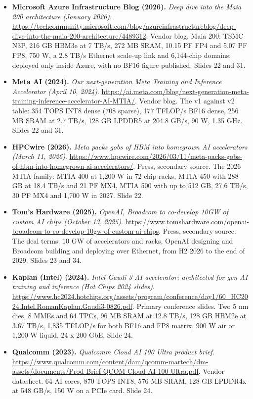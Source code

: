 \documentclass[11pt,letterpaper]{article}
\begin{document}
\begin{itemize}[leftmargin=1.2em,itemsep=3pt]
\item \textbf{Microsoft Azure Infrastructure Blog (2026).} \textit{Deep dive into the Maia 200 architecture (January 2026)}. \url{https://techcommunity.microsoft.com/blog/azureinfrastructureblog/deep-dive-into-the-maia-200-architecture/4489312}. Vendor blog. Maia 200: TSMC N3P, 216 GB HBM3e at 7 TB/s, 272 MB SRAM, 10.15 PF FP4 and 5.07 PF FP8, 750 W, a 2.8 TB/s Ethernet scale-up link and 6,144-chip domains; deployed only inside Azure, with no BF16 figure published. Slides 22 and 31.
\item \textbf{Meta AI (2024).} \textit{Our next-generation Meta Training and Inference Accelerator (April 10, 2024)}. \url{https://ai.meta.com/blog/next-generation-meta-training-inference-accelerator-AI-MTIA/}. Vendor blog. The v1 against v2 table: 354 TOPS INT8 dense (708 sparse), 177 TFLOP/s BF16 dense, 256 MB SRAM at 2.7 TB/s, 128 GB LPDDR5 at 204.8 GB/s, 90 W, 1.35 GHz. Slides 22 and 31.
\item \textbf{HPCwire (2026).} \textit{Meta packs gobs of HBM into homegrown AI accelerators (March 11, 2026)}. \url{https://www.hpcwire.com/2026/03/11/meta-packs-gobs-of-hbm-into-homegrown-ai-accelerators/}. Press, secondary source. The 2026 MTIA family: MTIA 400 at 1,200 W in 72-chip racks, MTIA 450 with 288 GB at 18.4 TB/s and 21 PF MX4, MTIA 500 with up to 512 GB, 27.6 TB/s, 30 PF MX4 and 1,700 W in 2027. Slide 22.
\item \textbf{Tom's Hardware (2025).} \textit{OpenAI, Broadcom to co-develop 10GW of custom AI chips (October 13, 2025)}. \url{https://www.tomshardware.com/openai-broadcom-to-co-develop-10gw-of-custom-ai-chips}. Press, secondary source. The deal terms: 10 GW of accelerators and racks, OpenAI designing and Broadcom building and deploying over Ethernet, from H2 2026 to the end of 2029. Slides 23 and 34.
\item \textbf{Kaplan (Intel) (2024).} \textit{Intel Gaudi 3 AI accelerator: architected for gen AI training and inference (Hot Chips 2024 slides)}. \url{https://www.hc2024.hotchips.org/assets/program/conference/day1/60_HC2024.Intel.RomanKaplan.Gaudi3-0826.pdf}. Primary conference slides. Two 5 nm dies, 8 MMEs and 64 TPCs, 96 MB SRAM at 12.8 TB/s, 128 GB HBM2e at 3.67 TB/s, 1,835 TFLOP/s for both BF16 and FP8 matrix, 900 W air or 1,200 W liquid, 24 x 200 GbE. Slide 24.
\item \textbf{Qualcomm (2023).} \textit{Qualcomm Cloud AI 100 Ultra product brief}. \url{https://www.qualcomm.com/content/dam/qcomm-martech/dm-assets/documents/Prod-Brief-QCOM-Cloud-AI-100-Ultra.pdf}. Vendor datasheet. 64 AI cores, 870 TOPS INT8, 576 MB SRAM, 128 GB LPDDR4x at 548 GB/s, 150 W on a PCIe card. Slide 24.

\end{itemize}
\end{document}
